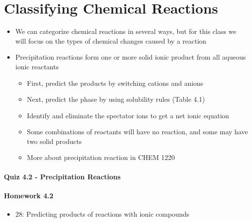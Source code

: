 \documentclass[12pt, openany, letterpaper]{memoir}
\begin{document}
\section{Classifying Chemical Reactions}
\begin{itemize}
  \item We can categorize chemical reactions in several ways, but for this class we will focus on the types of chemical changes caused by a reaction
  \item Precipitation reactions form one or more solid ionic product from all aqueous ionic reactants
    \begin{itemize}
      \item First, predict the products by switching cations and anions
      \item Next, predict the phase by using solubility rules (Table 4.1)
      \item Identify and eliminate the spectator ions to get a net ionic equation
      \item Some combinations of reactants will have no reaction, and some may have two solid products
      \item More about precipitation reaction in CHEM 1220
    \end{itemize}
\end{itemize}

\paragraph*{Quiz 4.2 - Precipitation Reactions}
\paragraph*{Homework 4.2}
\begin{itemize}
  \item 28: Predicting products of reactions with ionic compounds
\end{itemize}
\end{document}
